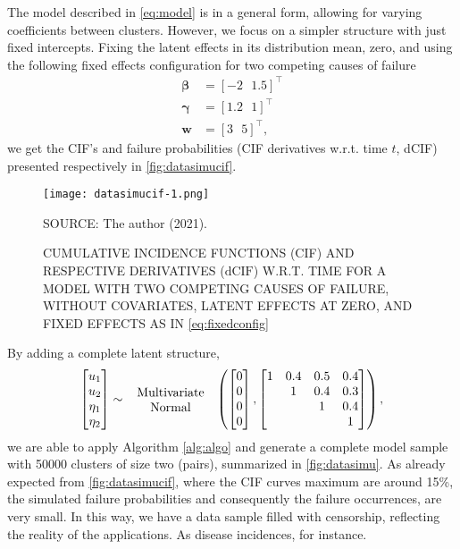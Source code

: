 The model described in \autoref{eq:model} is in a general form, allowing
for varying coefficients between clusters. However, we focus on a
simpler structure with just fixed intercepts. Fixing the latent effects
in its distribution mean, zero, and using the following fixed effects
configuration for two competing causes of failure
\begin{align}
 \bm{\beta} &= [-2~~~1.5]^{\top}\nonumber\\
 \bm{\gamma} &= [1.2~~~1]^{\top}\label{eq:fixedconfig}\\
 \bm{w} &= [3~~~5]^{\top}\nonumber,
\end{align}
we get the CIF's and failure probabilities (CIF derivatives w.r.t. time
\(t\), dCIF) presented respectively in \autoref{fig:datasimucif}.

\begin{figure}[H]
 \setlength{\abovecaptionskip}{.0001pt}
 \caption{CUMULATIVE INCIDENCE FUNCTIONS (CIF) AND RESPECTIVE
          DERIVATIVES (\(\text{dCIF}\)) W.R.T. TIME FOR A MODEL WITH
          TWO COMPETING CAUSES OF FAILURE, WITHOUT COVARIATES, LATENT
          EFFECTS AT ZERO, AND FIXED EFFECTS AS IN
          \autoref{eq:fixedconfig}}
 \vspace{0.2cm}\centering
 \texttt{[image: datasimucif-1.png]}\\
 \begin{footnotesize}
  SOURCE: The author (2021).
 \end{footnotesize}
 \label{fig:datasimucif}
\end{figure}

By adding a complete latent structure,
\begin{equation}
 \begin{bmatrix} u_{1}\\u_{2}\\\eta_{1}\\\eta_{2} \end{bmatrix}
 \sim\parbox{2.5cm}{\centering Multivariate Normal}
 \left(\begin{bmatrix} 0\\0\\0\\0 \end{bmatrix},
       \begin{bmatrix}
        1&0.4&0.5&0.4\\
         &1&0.4&0.3\\
         &&1&0.4\\
         &&&1
       \end{bmatrix}
 \right),\label{eq:latentconfig}
\end{equation}
we are able to apply Algorithm \autoref{alg:algo} and generate a
complete model sample with 50000 clusters of size two (pairs),
summarized in \autoref{fig:datasimu}. As already expected from
\autoref{fig:datasimucif}, where the CIF curves maximum are around 15\%,
the simulated failure probabilities and consequently the failure
occurrences, are very small. In this way, we have a data sample filled
with censorship, reflecting the reality of the applications. As disease
incidences, for instance.

